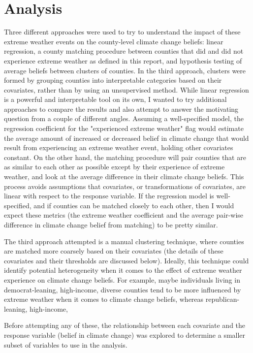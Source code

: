 \documentclass{article}
\begin{document}
\section{Analysis}
Three different approaches were used to try to understand the impact of these extreme weather events on the county-level climate change beliefs: linear regression, a county matching procedure between counties that did and did not experience extreme weather as defined in this report, and hypothesis testing of average beliefs between clusters of counties. In the third approach, clusters were formed by grouping counties into interpretable categories based on their covariates, rather than by using an unsupervised method. While linear regression is a powerful and interpretable tool on its own, I wanted to try additional approaches to compare the results and also attempt to answer the motivating question from a couple of different angles. Assuming a well-specified model, the regression coefficient for the "experienced extreme weather" flag would estimate the average amount of increased or decreased belief in climate change that would result from experiencing an extreme weather event, holding other covariates constant. On the other hand, the matching procedure will pair counties that are as similar to each other as possible except by their experience of extreme weather, and look at the average difference in their climate change beliefs. This process avoids assumptions that covariates, or transformations of covariates, are linear with respect to the response variable. If the regression model is well-specified, and if counties can be matched closely to each other, then I would expect these metrics (the extreme weather coefficient and the average pair-wise difference in climate change belief from matching) to be pretty similar.

The third approach attempted is a manual clustering technique, where counties are matched more coarsely based on their covariates (the details of these covariates and their thresholds are discussed below). Ideally, this technique could identify potential heterogeneity when it comes to the effect of extreme weather experience on climate change beliefs. For example, maybe individuals living in democrat-leaning, high-income, diverse counties tend to be more influenced by extreme weather when it comes to climate change beliefs, whereas republican-leaning, high-income, 

Before attempting any of these, the relationship between each covariate and the response variable (belief in climate change) was explored to determine a smaller subset of variables to use in the analysis. 
\end{document}
